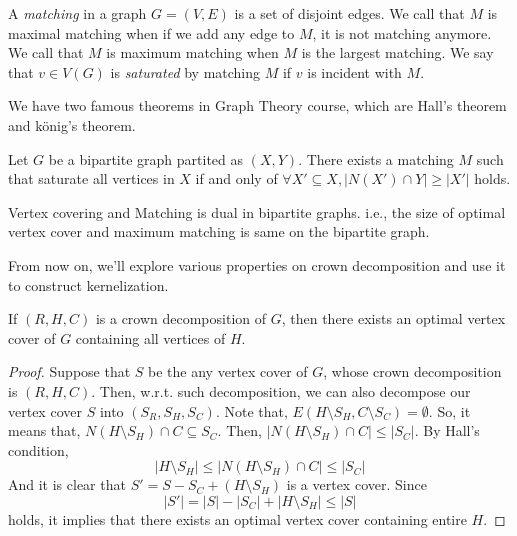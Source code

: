 \documentclass[12pt, a4paper, openany, twoside]{book}
\theoremstyle{definition}
\theoremstyle{remark}
\theoremstyle{plain}
\numberwithin{equation}{section}
\begin{document}
\begin{tcolorbox}[colback=yellow!10!white,colframe=brown!75!black,title=Matching and Saturated]

A \textit{matching} in a graph $G = (V, E)$ is a set of disjoint edges. We call that 
$M$ is maximal matching when if we add any edge to $M$, it is not matching anymore. We call that $M$ is maximum matching when 
$M$ is the largest matching. We say that $v \in V(G)$ is \textit{saturated} by matching $M$ if $v$ is incident with $M$. 

\end{tcolorbox}

We have two famous theorems in Graph Theory course, which are Hall's theorem and k\"onig's theorem. 

\begin{tcolorbox}[colback=yellow!10!white,colframe=red!75!black,title=Hall's Theorem]

Let $G$ be a bipartite graph partited as $(X, Y)$. There exists a matching $M$ such that saturate all vertices in $X$ if and only of $\forall X' \subseteq X, |N(X')\cap Y| \geq |X'|$ holds. 


\end{tcolorbox}

\begin{tcolorbox}[colback=yellow!10!white,colframe=red!75!black,title=K\"onig's Theorem]

Vertex covering and Matching is dual in bipartite graphs. i.e., 
the size of optimal vertex cover and maximum matching is same on the bipartite graph. 

\end{tcolorbox}

From now on, we'll explore various properties on crown decomposition and use it to construct kernelization. 

\begin{tcolorbox}[colback=yellow!10!white,colframe=green!75!black,title=Lemma]

If $(R, H, C)$ is a crown decomposition of $G$, then there exists an optimal vertex cover of $G$ containing all vertices of $H$. 

\end{tcolorbox}

\begin{proof}
    
Suppose that $S$ be the any vertex cover of $G$, whose crown decomposition is $(R, H, C)$. Then, 
w.r.t. such decomposition, we can also decompose our vertex cover $S$ into $(S_R, S_H, S_C)$. 
Note that, $E(H \setminus S_H, C \setminus S_C) = \emptyset$. So, it means that, $N(H \setminus S_H) \cap C \subseteq S_C$. 
Then, $|N(H \setminus S_H) \cap C| \leq |S_C| $. By Hall's condition, 
\[|H \setminus S_H| \leq |N(H \setminus S_H) \cap C| \leq |S_C|\]
And it is clear that $S' = S - S_C + (H \setminus S_H)$ is a vertex cover. Since 
\[|S'| = |S| - |S_C| + |H \setminus S_H| \leq |S|\]
holds, it implies that there exists an optimal vertex cover containing entire $H$. 

\end{proof}
\end{document}
